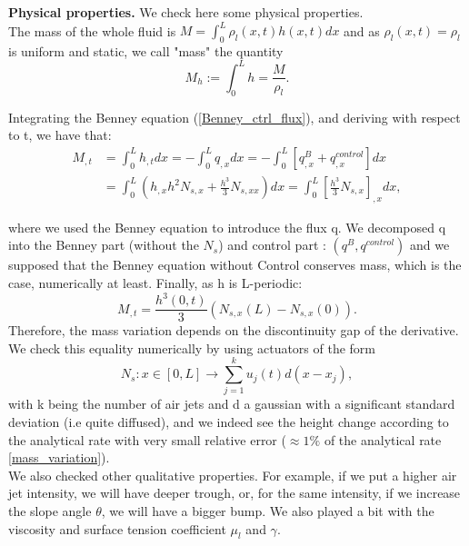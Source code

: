 \documentclass[12pt]{article}
\begin{document}
\textbf{Physical properties.}
We check here some physical properties.
\\

The mass of the whole fluid is $M=\int_0^L\rho_l(x,t)h(x,t)dx$ and as $\rho_l(x,t)=\rho_l$ is uniform and static, we call "mass" the quantity 
\begin{equation}
M_h := \int_0^Lh = \frac{M}{\rho_l}.
\end{equation}

Integrating the Benney equation (\ref{Benney_ctrl_flux}), and deriving with respect to t, we have that: 
\begin{align*}
    M_{,t}&=\int_0^Lh_{,t}dx=-\int_0^L q_{,x}dx = -\int_0^L[q^B_{,x}+q^{control}_{,x}]dx \\ &= \int_0^L(h_{,x}h^2N_{s,x}+\frac{h^3}{3}N_{s,xx})dx=\int_0^L[\frac{h^3}{3}N_{s,x}]_{,x}dx ,
\end{align*}

where we used the Benney equation to introduce the flux q. We decomposed q into the Benney part (without the $N_s$) and control part : $(q^B, q^{control})$ and we supposed that the Benney equation without Control conserves mass, which is the case, numerically at least.
Finally, as h is L-periodic: 
\begin{equation}\label{mass_variation}
M_{,t} = \frac{h^3(0,t)}{3}(N_{s,x}(L)-N_{s,x}(0)).
\end{equation}
Therefore, the mass variation depends on the discontinuity gap of the derivative. 
We check this equality numerically by using actuators of the form $$N_s: x\in [0,L] \rightarrow \sum_{j=1}^{k}u_j(t)d(x-x_j),$$ with k being the number of air jets and d a gaussian with a significant standard deviation (i.e quite diffused), and we indeed see the height change according to the analytical rate with very small relative error ($\approx 1\%$ of the analytical rate \eqref{mass_variation}).  
\\

We also checked other qualitative properties. For example, if we put a higher air jet intensity, we will have deeper trough, or, for the same intensity, if we increase the slope angle $\theta$, we will have a bigger bump. We also played a bit with the viscosity and surface tension coefficient $\mu_l$ and $\gamma$.





\newpage
\end{document}
